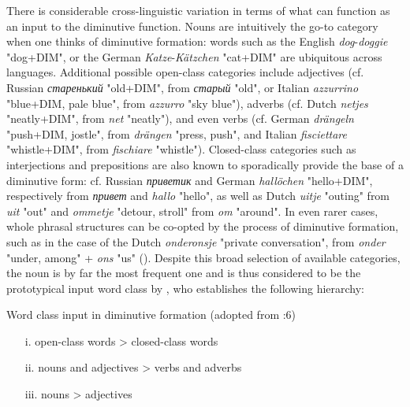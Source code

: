 There is considerable cross-linguistic variation in terms of what can function as an input to the diminutive function. Nouns are intuitively the go-to category when one thinks of diminutive formation: words such as the English \textit{dog}-\textit{doggie} "dog+DIM", or the German \textit{Katze}-\textit{Kätzchen} "cat+DIM" are ubiquitous across languages. Additional possible open-class categories include adjectives (cf. Russian \textit{старенький} "old+DIM", from \textit{старый} "old", or Italian \textit{azzurrino} "blue+DIM, pale blue", from \textit{azzurro} "sky blue"), adverbs (cf. Dutch \textit{netjes} "neatly+DIM", from \textit{net} "neatly"), and even verbs (cf. German \textit{drängeln} "push+DIM, jostle", from \textit{drängen} "press, push", and Italian \textit{fisciettare} "whistle+DIM", from \textit{fischiare} "whistle"). Closed-class categories such as interjections and prepositions are also known to sporadically provide the base of a diminutive form: cf. Russian \textit{приветик} and German \textit{hallöchen} "hello+DIM", respectively from \textit{привет} and \textit{hallo} "hello", as well as Dutch \textit{uitje} "outing" from \textit{uit} "out" and \textit{ommetje} "detour, stroll" from \textit{om} "around". In even rarer cases, whole phrasal structures can be co-opted by the process of diminutive formation, such as in the case of the Dutch \textit{onderonsje} "private conversation", from \textit{onder} "under, among" + \textit{ons} "us" (\cite{taalportaal}). Despite this broad selection of available categories, the noun is by far the most frequent one and is thus considered to be the prototypical input word class by \cite{Schneider+2003}, who establishes the following hierarchy:

\begin{exe}
\ex \label{ex:inputhierarchy}
Word class input in diminutive formation (adopted from \citeauthor{Schneider+2003} \citeyear{Schneider+2003}:6)
\begin{enumerate}
\item[i.] open-class words > closed-class words
\item[ii.] nouns and adjectives > verbs and adverbs
\item[iii.] nouns > adjectives
\end{enumerate}
\end{exe}

